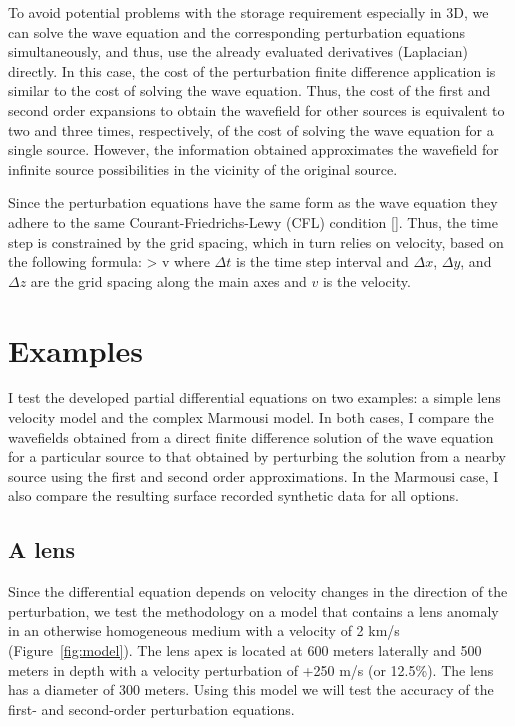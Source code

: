 To avoid potential problems with the storage requirement especially in 3D, we can 
solve the wave equation and the corresponding 
perturbation equations simultaneously, and thus, use the already evaluated derivatives (Laplacian) directly. 
In this case, the cost of the perturbation finite difference application is similar to the 
cost of solving the wave equation. Thus, the cost of the first and second order expansions to obtain the wavefield for other sources is equivalent to two
and three times, respectively, of the cost of solving the wave equation for a single source. However, the information obtained approximates the wavefield for infinite 
source possibilities in the vicinity of the original source.

Since the perturbation equations have the same form as the wave equation they adhere to the same Courant-Friedrichs-Lewy (CFL) condition [\cite{CFL}]. Thus,
the time step is constrained by the grid spacing, which in turn relies on velocity, based on the following formula:
\beq
{} >  v
\eeq
where $\Delta t$ is the time step interval and $\Delta x$, $\Delta y$,
and $\Delta z$ are the grid spacing along the main axes and $v$ is the velocity.


\section{Examples}

I test the developed partial differential equations on two examples: a simple lens velocity model and the complex Marmousi model. In both cases, I compare
the wavefields obtained from a direct finite difference solution of the wave equation for a particular source to that obtained by perturbing the solution
from a nearby source using the first and second order approximations. In the Marmousi case, I also compare the resulting surface
recorded synthetic data for all options.

\subsection{A lens}


Since the differential equation depends on velocity changes in the direction of the perturbation, we test the methodology on a model that 
contains a lens anomaly in an otherwise homogeneous medium with a velocity of 2 km/s (Figure~\ref{fig:model}). 
The lens apex is located at 600 meters laterally and 500 meters in depth with a velocity perturbation of
+250 m/s (or 12.5\%). The lens has a diameter of 300 meters. Using this model 
we will test the accuracy of the first- and second-order perturbation  equations.

